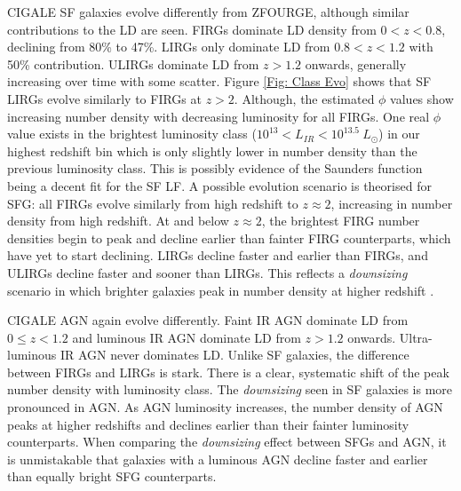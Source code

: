 CIGALE SF galaxies evolve differently from ZFOURGE, although similar contributions to the LD are seen. FIRGs dominate LD density from $0<z<0.8$, declining from 80\% to 47\%. LIRGs only dominate LD from $0.8<z<1.2$ with 50\% contribution. ULIRGs dominate LD from $z>1.2$ onwards, generally increasing over time with some scatter. Figure \ref{Fig: Class Evo} shows that SF LIRGs evolve similarly to FIRGs at $z>2$. Although, the estimated $\phi$ values show increasing number density with decreasing luminosity for all FIRGs. One real $\phi$ value exists in the brightest luminosity class ($10^{13} < L_{IR} < 10^{13.5}\ L_{\odot}$) in our highest redshift bin which is only slightly lower in number density than the previous luminosity class. This is possibly evidence of the Saunders function being a decent fit for the SF LF. A possible evolution scenario is theorised for SFG: all FIRGs evolve similarly from high redshift to $z \approx 2$, increasing in number density from high redshift. At and below $z \approx 2$, the brightest FIRG number densities begin to peak and decline earlier than fainter FIRG counterparts, which have yet to start declining. LIRGs decline faster and earlier than FIRGs, and ULIRGs decline faster and sooner than LIRGs. This reflects a \textit{downsizing} scenario in which brighter galaxies peak in number density at higher redshift \citep{merloni_synthesis_2008, wylezalek_galaxy_2014, fiore_agn_2017}.

CIGALE AGN again evolve differently. Faint IR AGN dominate LD from $0 \leq z < 1.2$ and luminous IR AGN dominate LD from $z>1.2$ onwards. Ultra-luminous IR AGN never dominates LD. Unlike SF galaxies, the difference between FIRGs and LIRGs is stark. There is a clear, systematic shift of the peak number density with luminosity class. The \textit{downsizing} seen in SF galaxies is more pronounced in AGN. As AGN luminosity increases, the number density of AGN peaks at higher redshifts and declines earlier than their fainter luminosity counterparts. When comparing the \textit{downsizing} effect between SFGs and AGN, it is unmistakable that galaxies with a luminous AGN decline faster and earlier than equally bright SFG counterparts.